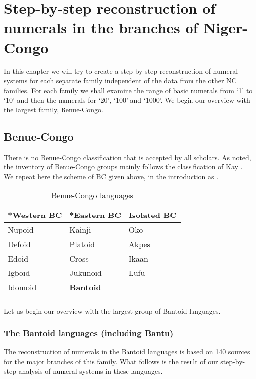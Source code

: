 \chapter{Step-by-step reconstruction of numerals in the branches of Niger-Congo} \label{sec:3}
In this chapter we will try to create a step-by-step reconstruction of numeral systems for each separate family independent of the data from the other NC families. For each family we shall examine the range of basic numerals from ‘1’ to ‘10’ and then the numerals for ‘20’, ‘100’ and ‘1000’. We begin our overview with the largest family, Benue-Congo. 

\section{Benue-Congo} %

There is no Benue-Congo classification that is accepted by all scholars. As noted, the inventory of Benue-Congo groups mainly follows the classification of Kay \citet[266-269]{Williamson1989b}. We repeat here the scheme of BC given above, in the introduction as .

\begin{table}
\caption{Benue-Congo languages}
\label{tab:3:bclg}
\begin{tabularx}{.8\textwidth}{XXl}
\lsptoprule
*Western BC & *Eastern BC & Isolated BC\\
\midrule 
Nupoid & Kainji & Oko\index{Oko!}\\
Defoid & Platoid & Akpes\index{Akpes!} \\
Edoid & Cross & Ikaan\index{Ikaan!}\\
Igboid & Jukunoid & Lufu\index{Lufu!}\\
Idomoid & \textbf{Bantoid} & \\
\lspbottomrule
\end{tabularx}
\end{table}

{\textmd{Let us begin our overview with the largest group of Bantoid languages.}}
 
\subsection{The Bantoid languages (including Bantu)}\label{sec:3.1.1}
The reconstruction of numerals in the Bantoid languages is based on 140 sources for the major branches of this family. What follows is the result of our step-by-step analysis of numeral systems in these languages.

